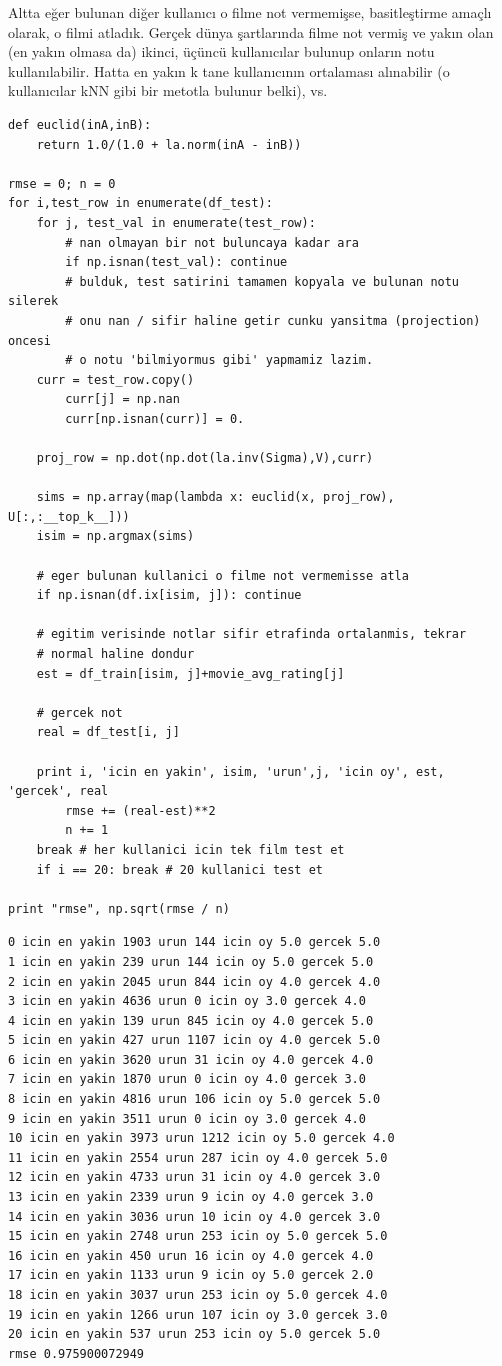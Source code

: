 \documentclass[12pt,fleqn]{article}\usepackage{../../common}
\begin{document}
Altta eğer bulunan diğer kullanıcı o filme not vermemişse, basitleştirme
amaçlı olarak, o filmi atladık. Gerçek dünya şartlarında filme not vermiş
ve yakın olan (en yakın olmasa da) ikinci, üçüncü kullanıcılar bulunup
onların notu kullanılabilir. Hatta en yakın k tane kullanıcının ortalaması
alınabilir (o kullanıcılar kNN gibi bir metotla bulunur belki), vs.

\begin{verbatim}
def euclid(inA,inB):
    return 1.0/(1.0 + la.norm(inA - inB))
    
rmse = 0; n = 0
for i,test_row in enumerate(df_test):
    for j, test_val in enumerate(test_row):
        # nan olmayan bir not buluncaya kadar ara
        if np.isnan(test_val): continue	
        # bulduk, test satirini tamamen kopyala ve bulunan notu silerek
        # onu nan / sifir haline getir cunku yansitma (projection) oncesi
        # o notu 'bilmiyormus gibi' yapmamiz lazim. 
	curr = test_row.copy()
        curr[j] = np.nan
        curr[np.isnan(curr)] = 0.

	proj_row = np.dot(np.dot(la.inv(Sigma),V),curr)

	sims = np.array(map(lambda x: euclid(x, proj_row), U[:,:__top_k__]))
	isim = np.argmax(sims)

	# eger bulunan kullanici o filme not vermemisse atla
	if np.isnan(df.ix[isim, j]): continue

	# egitim verisinde notlar sifir etrafinda ortalanmis, tekrar
	# normal haline dondur
	est = df_train[isim, j]+movie_avg_rating[j]

	# gercek not
	real = df_test[i, j]

	print i, 'icin en yakin', isim, 'urun',j, 'icin oy', est, 'gercek', real
        rmse += (real-est)**2
        n += 1
	break # her kullanici icin tek film test et
    if i == 20: break # 20 kullanici test et

print "rmse", np.sqrt(rmse / n)
\end{verbatim}

\begin{verbatim}
0 icin en yakin 1903 urun 144 icin oy 5.0 gercek 5.0
1 icin en yakin 239 urun 144 icin oy 5.0 gercek 5.0
2 icin en yakin 2045 urun 844 icin oy 4.0 gercek 4.0
3 icin en yakin 4636 urun 0 icin oy 3.0 gercek 4.0
4 icin en yakin 139 urun 845 icin oy 4.0 gercek 5.0
5 icin en yakin 427 urun 1107 icin oy 4.0 gercek 5.0
6 icin en yakin 3620 urun 31 icin oy 4.0 gercek 4.0
7 icin en yakin 1870 urun 0 icin oy 4.0 gercek 3.0
8 icin en yakin 4816 urun 106 icin oy 5.0 gercek 5.0
9 icin en yakin 3511 urun 0 icin oy 3.0 gercek 4.0
10 icin en yakin 3973 urun 1212 icin oy 5.0 gercek 4.0
11 icin en yakin 2554 urun 287 icin oy 4.0 gercek 5.0
12 icin en yakin 4733 urun 31 icin oy 4.0 gercek 3.0
13 icin en yakin 2339 urun 9 icin oy 4.0 gercek 3.0
14 icin en yakin 3036 urun 10 icin oy 4.0 gercek 3.0
15 icin en yakin 2748 urun 253 icin oy 5.0 gercek 5.0
16 icin en yakin 450 urun 16 icin oy 4.0 gercek 4.0
17 icin en yakin 1133 urun 9 icin oy 5.0 gercek 2.0
18 icin en yakin 3037 urun 253 icin oy 5.0 gercek 4.0
19 icin en yakin 1266 urun 107 icin oy 3.0 gercek 3.0
20 icin en yakin 537 urun 253 icin oy 5.0 gercek 5.0
rmse 0.975900072949
\end{verbatim}
\end{document}
